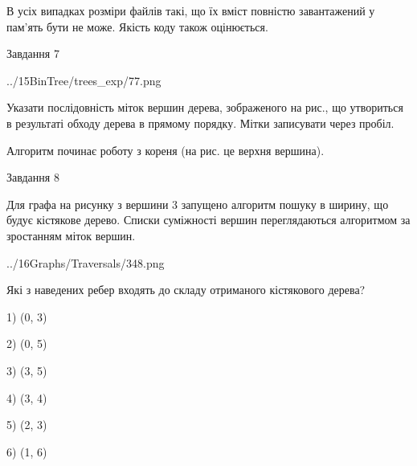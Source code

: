 \documentclass[12pt, ukrainian]{article}
\begin{document}
{В усіх випадках розміри файлів такі, що їх вміст повністю завантажений у пам'ять бути не може. Якість коду також оцінюється.



\vspace{10mm}\par

\newpage
\begin{minipage}[t]{9.7cm}
               
{\begin{center}Завдання {7}\end{center}}
\vspace{-4mm}

\begin{center}
	{../15BinTree/trees_exp/77.png}
\end{center}
Указати послідовність міток вершин дерева, зображеного на рис., що утвориться в результаті обходу дерева в прямому порядку. Мітки записувати через пробіл.\par Алгоритм починає роботу з кореня (на рис. це верхня вершина).\par

\end{minipage}
\vline \hspace{8mm}
\begin{minipage}[t]{8.0cm}
               
{\begin{center}Завдання {8}\end{center}}
\vspace{-4mm}
Для графа на рисунку з вершини 3 запущено алгоритм пошуку в ширину, що будує кістякове дерево. Списки суміжності вершин переглядаються алгоритмом за зростанням міток вершин.\par
\begin{center}
	{../16Graphs/Traversals/348.png}
\end{center}
\par Які з наведених ребер входять до складу отриманого кістякового дерева?\par
1) (0, 3)\par
2) (0, 5)\par
3) (3, 5)\par
4) (3, 4)\par
5) (2, 3)\par
6) (1, 6)\par
{\vskip 15pt} \par


\end{minipage}}
\end{document}
